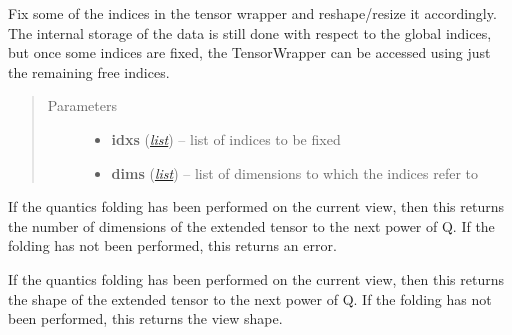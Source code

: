 \documentclass[a4paper,10pt,english]{sphinxmanual}
\begin{document}
\begin{fulllineitems}
\begin{fulllineitems}
\label{api-tw:TensorToolbox.core.TensorWrapper.fix_indices}
Fix some of the indices in the tensor wrapper and reshape/resize it accordingly. The internal storage of the data is still done with respect to the global indices, but once some indices are fixed, the TensorWrapper can be accessed using just the remaining free indices.
\begin{quote}\begin{description}
\item[{Parameters}] \leavevmode\begin{itemize}
\item {} 
\textbf{idxs} (\href{http://docs.python.org/library/functions.html\#list}{\emph{list}}) -- list of indices to be fixed

\item {} 
\textbf{dims} (\href{http://docs.python.org/library/functions.html\#list}{\emph{list}}) -- list of dimensions to which the indices refer to

\end{itemize}

\end{description}\end{quote}

\end{fulllineitems}


\begin{fulllineitems}
\label{api-tw:TensorToolbox.core.TensorWrapper.get_extended_ndim}
If the quantics folding has been performed on the current view, then this returns the number of dimensions of the extended tensor to the next power of Q. If the folding has not been performed, this returns an error.

\end{fulllineitems}


\begin{fulllineitems}
\label{api-tw:TensorToolbox.core.TensorWrapper.get_extended_shape}
If the quantics folding has been performed on the current view, then this returns the shape of the extended tensor to the next power of Q. If the folding has not been performed, this returns the view shape.


\end{fulllineitems}
\end{fulllineitems}
\end{document}
